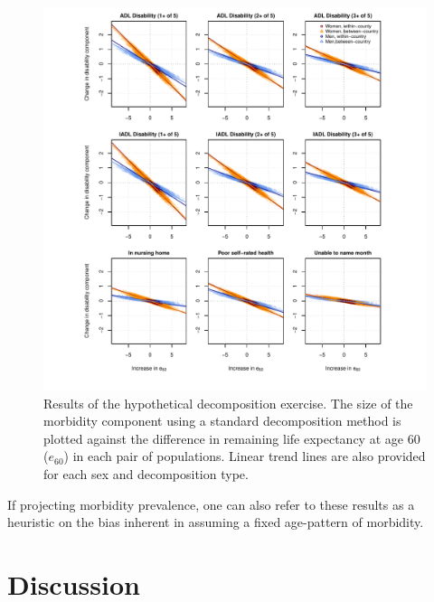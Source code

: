 \documentclass[11pt,oneside,a4paper]{article} %
\begin{document}
\begin{figure}
\begin{adjustwidth}{-1.5cm}{}
	\centering
	\includegraphics[scale=.8]{Figures/Decomp_3x3.pdf}
	\caption{Results of the hypothetical decomposition exercise. The size of the
	morbidity component using a standard decomposition method is plotted against
	the difference in remaining life expectancy at age 60 ($e_{60}$) in each
	pair of populations. Linear trend lines are also provided for each sex and decomposition type.}
	\label{fig:Fig_Decomp_3x3}
\end{adjustwidth}
\end{figure}

If projecting morbidity prevalence, one can also refer to these results as a
heuristic on the bias inherent in assuming a fixed age-pattern of morbidity.

\FloatBarrier
\section{Discussion}
\end{document}
